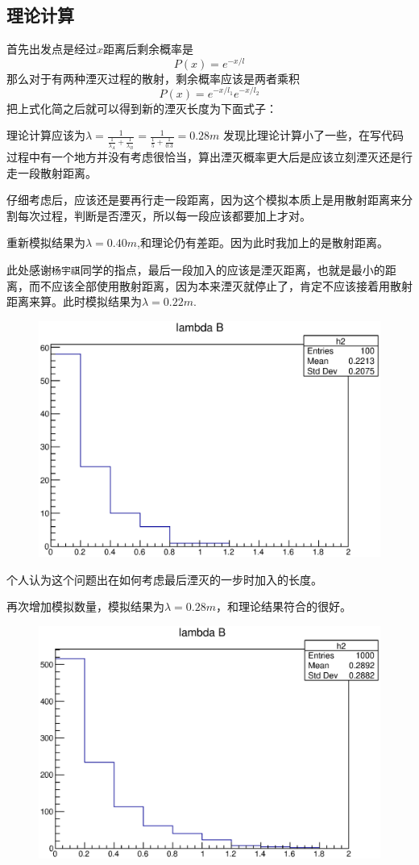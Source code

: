 \documentclass[UTF8]{ctexart}
\begin{document}
\subsection{理论计算}
首先出发点是经过$x$距离后剩余概率是
\[P(x)=e^{-x/l}\]
那么对于有两种湮灭过程的散射，剩余概率应该是两者乘积
\[P(x)=e^{-x/l_1}e^{-x/l_2}\]
把上式化简之后就可以得到新的湮灭长度为下面式子：

理论计算应该为$\lambda=\frac{1}{\frac{1}{\lambda_A}+\frac{1}{\lambda_B}}=\frac{1}{\frac{1}{5}+\frac{1}{0.3}}=0.28m$
发现比理论计算小了一些，在写代码过程中有一个地方并没有考虑很恰当，算出湮灭概率更大后是应该立刻湮灭还是行走一段散射距离。

仔细考虑后，应该还是要再行走一段距离，因为这个模拟本质上是用散射距离来分割每次过程，判断是否湮灭，所以每一段应该都要加上才对。

重新模拟结果为$\lambda=0.40m$,和理论仍有差距。因为此时我加上的是散射距离。

此处感谢\texttt{杨宇祺}同学的指点，最后一段加入的应该是湮灭距离，也就是最小的距离，而不应该全部使用散射距离，因为本来湮灭就停止了，肯定不应该接着用散射距离来算。此时模拟结果为$\lambda=0.22m$.

\begin{figure}[h]
\includegraphics[width=.8\textwidth]{distributionN100.eps}
\end{figure}

个人认为这个问题出在如何考虑最后湮灭的一步时加入的长度。

再次增加模拟数量，模拟结果为$\lambda=0.28m$，和理论结果符合的很好。

\begin{figure}[h]
\includegraphics[width=.8\textwidth]{distributionN1000.eps}
\end{figure}
\end{document}
